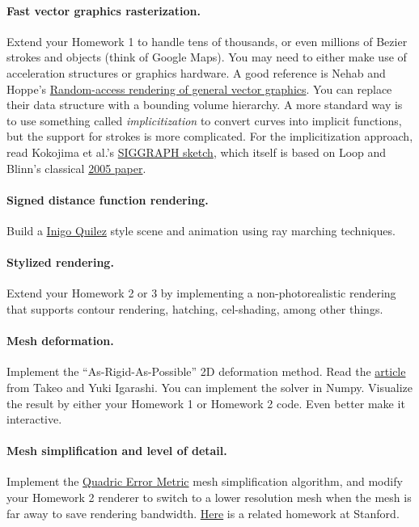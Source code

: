 \paragraph{Fast vector graphics rasterization.} Extend your Homework 1 to handle tens of thousands, or even millions of Bezier strokes and objects (think of Google Maps). You may need to either make use of acceleration structures or graphics hardware. A good reference is Nehab and Hoppe's \href{https://hhoppe.com/proj/ravg/}{Random-access rendering of general vector graphics}. You can replace their data structure with a bounding volume hierarchy. A more standard way is to use something called \emph{implicitization} to convert curves into implicit functions, but the support for strokes is more complicated. For the implicitization approach, read Kokojima et al.'s \href{https://dl.acm.org/doi/10.1145/1179849.1179997}{SIGGRAPH sketch}, which itself is based on Loop and Blinn's classical \href{https://dl.acm.org/doi/10.1145/1073204.1073303}{2005 paper}.

\paragraph{Signed distance function rendering.} Build a \href{https://iquilezles.org/}{Inigo Quilez} style scene and animation using ray marching techniques.

\paragraph{Stylized rendering.} Extend your Homework 2 or 3 by implementing a non-photorealistic rendering that supports contour rendering, hatching, cel-shading, among other things.

\paragraph{Mesh deformation.} Implement the ``As-Rigid-As-Possible'' 2D deformation method. Read the \href{https://www-ui.is.s.u-tokyo.ac.jp/~takeo/papers/takeo_jgt09_arapFlattening.pdf}{article} from Takeo and Yuki Igarashi. You can implement the solver in Numpy. Visualize the result by either your Homework 1 or Homework 2 code. Even better make it interactive.

\paragraph{Mesh simplification and level of detail.} Implement the \href{https://www.cs.cmu.edu/~garland/Papers/quadrics.pdf}{Quadric Error Metric} mesh simplification algorithm, and modify your Homework 2 renderer to switch to a lower resolution mesh when the mesh is far away to save rendering bandwidth. \href{https://stanford-cs248.github.io/Cardinal3D/meshedit/global/simplify}{Here} is a related homework at Stanford.

